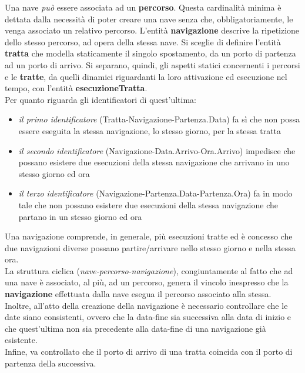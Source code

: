 \documentclass[a4paper, titlepage]{report}
\begin{document}
	\noindent
	Una nave \textit{può} essere associata ad un \textbf{percorso}. Questa cardinalità minima è dettata dalla necessità di poter creare una nave senza che, obbligatoriamente, le venga associato un relativo percorso. L'entità \textbf{navigazione} descrive la ripetizione dello stesso percorso, ad opera della stessa nave. Si sceglie di definire l'entità \textbf{tratta} che modella staticamente il singolo spostamento, da un porto di partenza ad un porto di arrivo. Si separano, quindi, gli aspetti statici concernenti i percorsi e le \textbf{tratte}, da quelli dinamici riguardanti la loro attivazione ed esecuzione nel tempo, con l'entità \textbf{esecuzioneTratta}. \\	
	Per quanto riguarda gli identificatori di quest'ultima: 
	\begin{itemize}
		\item \textit{il primo identificatore} (Tratta-Navigazione-Partenza.Data) fa sì che non possa essere eseguita la stessa navigazione, lo stesso giorno, per la stessa tratta
		\item \textit{il secondo identificatore} (Navigazione-Data.Arrivo-Ora.Arrivo) impedisce che possano esistere due esecuzioni della stessa navigazione che arrivano in uno stesso giorno ed ora
		\item \textit{il terzo identificatore} (Navigazione-Partenza.Data-Partenza.Ora) fa in modo tale che non possano esistere due esecuzioni della stessa navigazione che partano in un stesso giorno ed ora
	\end{itemize}
	Una navigazione comprende, in generale, più esecuzioni tratte ed è concesso che due navigazioni diverse possano partire/arrivare nello stesso giorno e nella stessa ora. \\
	
	\noindent		
	La struttura ciclica (\textit{nave-percorso-navigazione}), congiuntamente al fatto che ad una nave è associato, al più, ad un percorso, genera il vincolo inespresso che la \textbf{navigazione} effettuata dalla nave esegua il percorso associato alla stessa.\\	
	Inoltre, all'atto della creazione della navigazione è necessario controllare che le date siano consistenti, ovvero che la data-fine sia successiva alla data di inizio e che quest'ultima non sia precedente alla data-fine di una navigazione già esistente.\\	
	Infine, va controllato che il porto di arrivo di una tratta coincida con il porto di partenza della successiva. \\	
	
\end{document}
